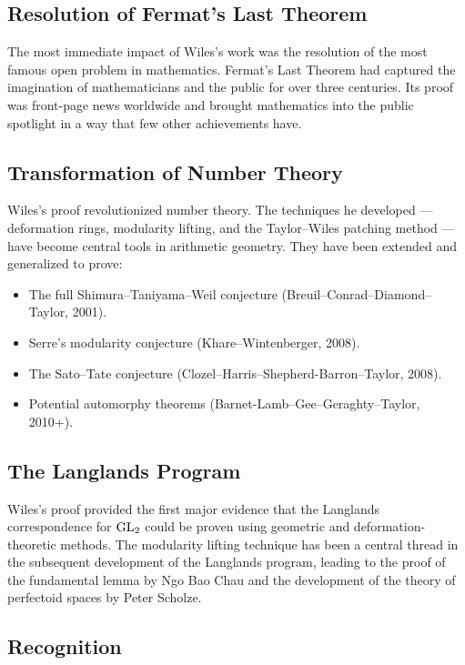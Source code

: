 \subsection{Resolution of Fermat's Last Theorem}

The most immediate impact of Wiles's work was the resolution of the most famous open problem in mathematics. Fermat's Last Theorem had captured the imagination of mathematicians and the public for over three centuries. Its proof was front-page news worldwide and brought mathematics into the public spotlight in a way that few other achievements have.

\subsection{Transformation of Number Theory}

Wiles's proof revolutionized number theory. The techniques he developed --- deformation rings, modularity lifting, and the Taylor--Wiles patching method --- have become central tools in arithmetic geometry. They have been extended and generalized to prove:

\begin{itemize}
    \item The full Shimura--Taniyama--Weil conjecture (Breuil--Conrad--Diamond--Taylor, 2001).
    \item Serre's modularity conjecture (Khare--Wintenberger, 2008).
    \item The Sato--Tate conjecture (Clozel--Harris--Shepherd-Barron--Taylor, 2008).
    \item Potential automorphy theorems (Barnet-Lamb--Gee--Geraghty--Taylor, 2010+).
\end{itemize}

\subsection{The Langlands Program}

Wiles's proof provided the first major evidence that the Langlands correspondence for \(\operatorname{GL}_2\) could be proven using geometric and deformation-theoretic methods. The modularity lifting technique has been a central thread in the subsequent development of the Langlands program, leading to the proof of the fundamental lemma by Ngo Bao Chau and the development of the theory of perfectoid spaces by Peter Scholze.

\subsection{Recognition}

